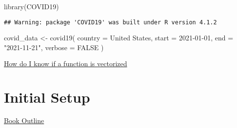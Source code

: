 \documentclass[
]{book}
\newenvironment{Shaded}{\begin{snugshade}}{\end{snugshade}}
\newcommand{\AttributeTok}[1]{\textcolor[rgb]{0.77,0.63,0.00}{#1}}
\newcommand{\ConstantTok}[1]{\textcolor[rgb]{0.00,0.00,0.00}{#1}}
\newcommand{\FunctionTok}[1]{\textcolor[rgb]{0.00,0.00,0.00}{#1}}
\newcommand{\NormalTok}[1]{#1}
\newcommand{\OtherTok}[1]{\textcolor[rgb]{0.56,0.35,0.01}{#1}}
\newcommand{\StringTok}[1]{\textcolor[rgb]{0.31,0.60,0.02}{#1}}
\begin{document}
\begin{Shaded}
\begin{Highlighting}[]
\FunctionTok{library}\NormalTok{(COVID19)}
\end{Highlighting}
\end{Shaded}

\begin{verbatim}
## Warning: package 'COVID19' was built under R version 4.1.2
\end{verbatim}

\begin{Shaded}
\begin{Highlighting}[]
\NormalTok{covid\_data }\OtherTok{\textless{}{-}} \FunctionTok{covid19}\NormalTok{(}
    \AttributeTok{country =} \StringTok{\textquotesingle{}United States\textquotesingle{}}\NormalTok{, }
    \AttributeTok{start =} \StringTok{\textquotesingle{}2021{-}01{-}01\textquotesingle{}}\NormalTok{, }
    \AttributeTok{end =} \StringTok{"2021{-}11{-}21"}\NormalTok{,}
    \AttributeTok{verbose =} \ConstantTok{FALSE}
\NormalTok{)}
\end{Highlighting}
\end{Shaded}

\href{https://stackoverflow.com/questions/58568392/how-do-i-know-a-function-or-an-operation-in-r-is-vectorized\#:~:text=To\%20identify\%20if\%20an\%20R\%20object\%20is\%20a\%20vector\%20\%2C\%20I,a\%20vector\%20or\%20False\%20otherwise.}{How do I know if a function is vectorized}

\hypertarget{initial-setup}{%
\section{Initial Setup}\label{initial-setup}}

\href{https://hackmd.io/vGRGEPo8QQyiG8gecWv71g}{Book Outline}
\end{document}
